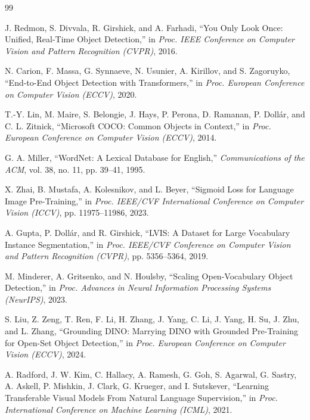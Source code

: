 \vspace{-1mm}
\begin{thebibliography}{99}

    J. Redmon, S. Divvala, R. Girshick, and A. Farhadi,
    ``You Only Look Once: Unified, Real-Time Object Detection,''
    in {\it Proc. IEEE Conference on Computer Vision and Pattern Recognition (CVPR)}, 2016.

    N. Carion, F. Massa, G. Synnaeve, N. Usunier, A. Kirillov, and S. Zagoruyko,
    ``End-to-End Object Detection with Transformers,''
    in {\it Proc. European Conference on Computer Vision (ECCV)}, 2020.

    T.-Y. Lin, M. Maire, S. Belongie, J. Hays, P. Perona, D. Ramanan, P. Doll\'{a}r, and C. L. Zitnick,
    ``Microsoft COCO: Common Objects in Context,''
    in {\it Proc. European Conference on Computer Vision (ECCV)}, 2014.

    G. A. Miller,
    ``WordNet: A Lexical Database for English,''
    {\it Communications of the ACM}, vol. 38, no. 11, pp. 39--41, 1995.

    X. Zhai, B. Mustafa, A. Kolesnikov, and L. Beyer,
    ``Sigmoid Loss for Language Image Pre-Training,''
    in {\it Proc. IEEE/CVF International Conference on Computer Vision (ICCV)}, pp. 11975--11986, 2023.

    A. Gupta, P. Doll\'{a}r, and R. Girshick,
    ``LVIS: A Dataset for Large Vocabulary Instance Segmentation,''
    in {\it Proc. IEEE/CVF Conference on Computer Vision and Pattern Recognition (CVPR)}, pp. 5356--5364, 2019.

    M. Minderer, A. Gritsenko, and N. Houlsby,
    ``Scaling Open-Vocabulary Object Detection,''
    in {\it Proc. Advances in Neural Information Processing Systems (NeurIPS)}, 2023.

    S. Liu, Z. Zeng, T. Ren, F. Li, H. Zhang, J. Yang, C. Li, J. Yang, H. Su, J. Zhu, and L. Zhang,
    ``Grounding DINO: Marrying DINO with Grounded Pre-Training for Open-Set Object Detection,''
    in {\it Proc. European Conference on Computer Vision (ECCV)}, 2024.

    A. Radford, J. W. Kim, C. Hallacy, A. Ramesh, G. Goh, S. Agarwal, G. Sastry, A. Askell, P. Mishkin, J. Clark, G. Krueger, and I. Sutskever,
    ``Learning Transferable Visual Models From Natural Language Supervision,''
    in {\it Proc. International Conference on Machine Learning (ICML)}, 2021.


\end{thebibliography}
